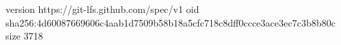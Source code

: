 version https://git-lfs.github.com/spec/v1
oid sha256:4d60087669606c4aab1d7509b58b18a5cfc718c8dff0ccce3ace3ec7c3b8b80c
size 3718
